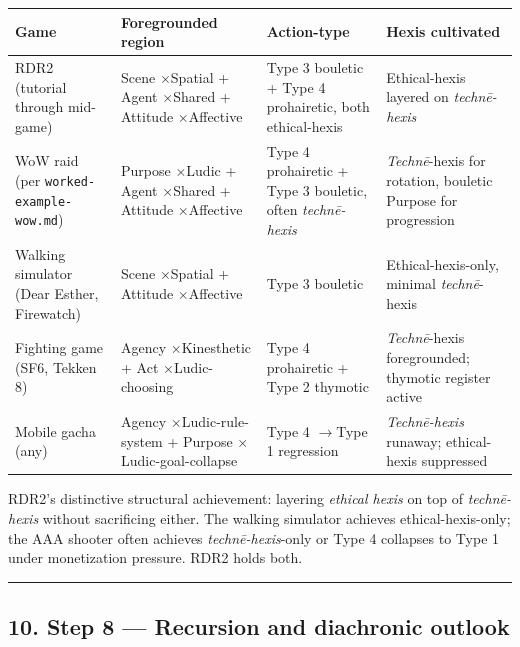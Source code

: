 \documentclass[11pt]{report}
\begin{document}
\begin{table}[H]
\small
\renewcommand{\arraystretch}{1.25}
\begin{tabularx}{\textwidth}{>{\RaggedRight\arraybackslash}X>{\RaggedRight\arraybackslash}X>{\RaggedRight\arraybackslash}X>{\RaggedRight\arraybackslash}X}
\toprule
Game & Foregrounded region & Action-type & Hexis cultivated \\
\midrule
RDR2 (tutorial through mid-game) & Scene $\times$\allowbreak  Spatial + Agent $\times$\allowbreak  Shared + Attitude $\times$\allowbreak  Affective & Type 3 bouletic + Type 4 prohairetic, both ethical-hexis & Ethical-hexis layered on \textit{technē-hexis} \\
WoW raid (per \texttt{worked-\discretionary{}{}{}example-\discretionary{}{}{}wow.\discretionary{}{}{}md}) & Purpose $\times$\allowbreak  Ludic + Agent $\times$\allowbreak  Shared + Attitude $\times$\allowbreak  Affective & Type 4 prohairetic + Type 3 bouletic, often \textit{technē-hexis} & \textit{Technē}-hexis for rotation, bouletic Purpose for progression \\
Walking simulator (Dear Esther, Firewatch) & Scene $\times$\allowbreak  Spatial + Attitude $\times$\allowbreak  Affective & Type 3 bouletic & Ethical-hexis-only, minimal \textit{technē}-hexis \\
Fighting game (SF6, Tekken 8) & Agency $\times$\allowbreak  Kinesthetic + Act $\times$\allowbreak  Ludic-choosing & Type 4 prohairetic + Type 2 thymotic & \textit{Technē}-hexis foregrounded; thymotic register active \\
Mobile gacha (any) & Agency $\times$\allowbreak  Ludic-rule-system + Purpose $\times$\allowbreak  Ludic-goal-collapse & Type 4 $\rightarrow$\allowbreak  Type 1 regression & \textit{Technē-hexis} runaway; ethical-hexis suppressed \\
\bottomrule
\end{tabularx}
\end{table}


RDR2's distinctive structural achievement: layering \textit{ethical hexis} on top of \textit{technē-hexis} without sacrificing either. The walking simulator achieves ethical-hexis-only; the AAA shooter often achieves \textit{technē-hexis}-only or Type 4 collapses to Type 1 under monetization pressure. RDR2 holds both.


\vspace{0.4em}\hrule\vspace{0.8em}


\subsection{10. Step 8 — Recursion and diachronic outlook}
\end{document}
